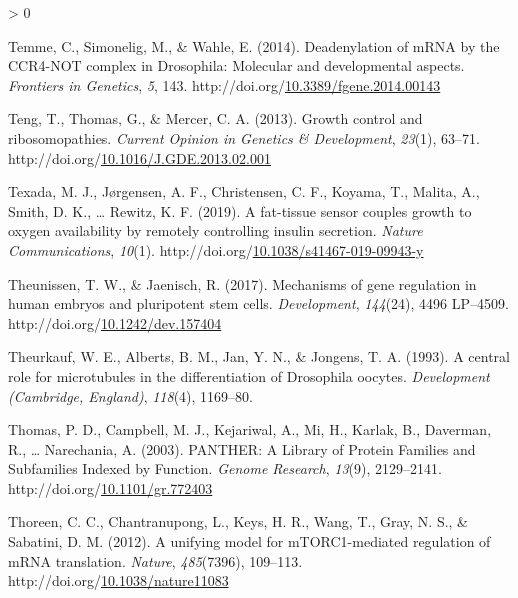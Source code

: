 \documentclass[12pt,oneside]{reedthesis}
\newlength{\cslhangindent}
\newenvironment{CSLReferences}[2] %
 {%
  \setlength{\parindent}{0pt}
  \ifodd #1 \everypar{\setlength{\hangindent}{\cslhangindent}}\ignorespaces\fi
  \ifnum #2 > 0
  \setlength{\parskip}{#2\baselineskip}
  \fi
 }%
 {}
\begin{document}
\begin{CSLReferences}{1}{0}
\leavevmode\hypertarget{ref-Temme2014j}{}%
Temme, C., Simonelig, M., \& Wahle, E. (2014). Deadenylation of {mRNA} by the {CCR4-NOT} complex in {Drosophila}: Molecular and developmental aspects. \emph{Frontiers in Genetics}, \emph{5}, 143. http://doi.org/\href{https://doi.org/10.3389/fgene.2014.00143}{10.3389/fgene.2014.00143}

\leavevmode\hypertarget{ref-Teng2013}{}%
Teng, T., Thomas, G., \& Mercer, C. A. (2013). Growth control and ribosomopathies. \emph{Current Opinion in Genetics \& Development}, \emph{23}(1), 63--71. http://doi.org/\href{https://doi.org/10.1016/J.GDE.2013.02.001}{10.1016/J.GDE.2013.02.001}

\leavevmode\hypertarget{ref-Texada2019}{}%
Texada, M. J., Jørgensen, A. F., Christensen, C. F., Koyama, T., Malita, A., Smith, D. K., \ldots{} Rewitz, K. F. (2019). A fat-tissue sensor couples growth to oxygen availability by remotely controlling insulin secretion. \emph{Nature Communications}, \emph{10}(1). http://doi.org/\href{https://doi.org/10.1038/s41467-019-09943-y}{10.1038/s41467-019-09943-y}

\leavevmode\hypertarget{ref-Theunissen2017b}{}%
Theunissen, T. W., \& Jaenisch, R. (2017). Mechanisms of gene regulation in human embryos and pluripotent stem cells. \emph{Development}, \emph{144}(24), 4496 LP--4509. http://doi.org/\href{https://doi.org/10.1242/dev.157404}{10.1242/dev.157404}

\leavevmode\hypertarget{ref-theurkaufCentralRoleMicrotubules1993}{}%
Theurkauf, W. E., Alberts, B. M., Jan, Y. N., \& Jongens, T. A. (1993). A central role for microtubules in the differentiation of {Drosophila} oocytes. \emph{Development (Cambridge, England)}, \emph{118}(4), 1169--80.

\leavevmode\hypertarget{ref-thomasPANTHERLibraryProtein2003}{}%
Thomas, P. D., Campbell, M. J., Kejariwal, A., Mi, H., Karlak, B., Daverman, R., \ldots{} Narechania, A. (2003). {PANTHER}: {A Library} of {Protein Families} and {Subfamilies Indexed} by {Function}. \emph{Genome Research}, \emph{13}(9), 2129--2141. http://doi.org/\href{https://doi.org/10.1101/gr.772403}{10.1101/gr.772403}

\leavevmode\hypertarget{ref-thoreenUnifyingModelMTORC1mediated2012}{}%
Thoreen, C. C., Chantranupong, L., Keys, H. R., Wang, T., Gray, N. S., \& Sabatini, D. M. (2012). A unifying model for {mTORC1-mediated} regulation of {mRNA} translation. \emph{Nature}, \emph{485}(7396), 109--113. http://doi.org/\href{https://doi.org/10.1038/nature11083}{10.1038/nature11083}


\end{CSLReferences}
\end{document}
